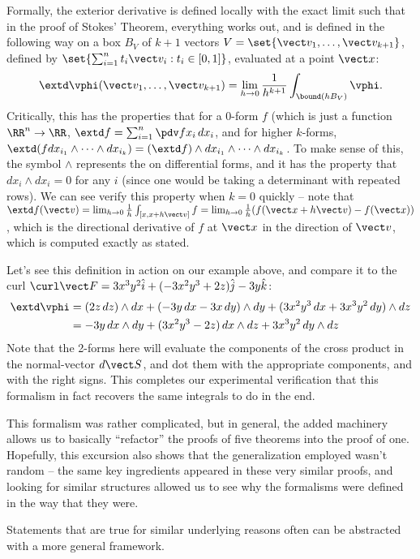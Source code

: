 \documentclass[12pt]{article}
\begin{document}
 Formally, the exterior derivative is defined locally with the exact limit such
 that in the proof of Stokes' Theorem, everything works out, and is defined in
 the following way on a box $B_V$ of $k+1$ vectors $V = \set{\vect v_1, \dots,
   \vect v_{k+1}}$, defined by $\set{\sum_{i=1}^n t_i \vect v_i : t_i \in
 [0,1]}$, evaluated at a point $\vect x$: \[
   \extd\vphi(\vect v_1, \dots, \vect v_{k+1}) = \lim_{h \to 0} \frac{1}{h^{k+1}}
   \int_{\bound (h B_V)} \vphi. 
 \]
 Critically, this has the properties that for a 0-form $f$ (which is just a
 function $\RR^n \to \RR$, $\extd f = \sum_{i=1}^n \pdv f {x_i} \, dx_i$, and
 for higher $k$-forms, $\extd(f dx_{i_1} \wedge \dots \wedge dx_{i_k}) = (\extd f)
\wedge dx_{i_1} \wedge \dots \wedge dx_{i_k}$. To make sense of this, the symbol
$\wedge$ represents the  on differential forms, and it has
the property that $dx_i \wedge dx_i = 0$ for any $i$ (since one would be
taking a determinant with repeated rows). We can see verify this property when
$k = 0$ quickly -- note that $\extd f(\vect v) = \lim_{h \to 0} \frac{1}{h}
\int_{[x, x+h\vect v]} f = \lim_{h \to 0} \frac{1}{h} (f(\vect x + h \vect v)  -
f(\vect x))$, which is the directional derivative of $f$ at $\vect x$ in the
direction of $\vect v$, which is computed exactly as stated. 

Let's see this definition in action on our example above, and compare it to the
curl $\curl \vect F = 3x^3 y^2 \hat i + (-3x^2y^3 + 2z) \hat j -3y \hat k$: 
\begin{align*}
  \extd \vphi &= (2z \, dz) \wedge dx + (-3y \, dx - 3x \, dy) \wedge dy + (3x^2
y^3 \, dx + 3x^3 y^2 \, dy) \wedge dz \\
              &= -3y \, dx \wedge dy + (3x^2 y^3 - 2z) \,
dx \wedge dz + 3x^3 y^2 \, dy \wedge dz
\end{align*}
Note that the 2-forms here will evaluate the components of the cross
product in the normal-vector $d \vect S$, and dot them with the
appropriate components, and with the right signs. This completes our
experimental verification that this formalism in fact recovers the same
integrals to do in the end.  

This formalism was rather complicated, but in general, the added machinery
allows us to basically ``refactor'' the proofs of five theorems into the proof
of one. Hopefully, this excursion also shows that the generalization employed
wasn't random -- the same key ingredients appeared in these very similar proofs,
and looking for similar structures allowed us to see why the formalisms were
defined in the way that they were.   
\begin{idea}
  Statements that are true for similar underlying reasons often can be
  abstracted with a more general framework. 
\end{idea}
\end{document}
